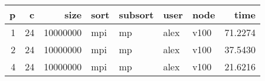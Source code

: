 \begin{tabular}{rrrllllr}
\toprule
 p &  c &     size & sort & subsort & user & node &    time \\
\midrule
 1 & 24 & 10000000 &  mpi &      mp & alex & v100 & 71.2274 \\
 2 & 24 & 10000000 &  mpi &      mp & alex & v100 & 37.5430 \\
 4 & 24 & 10000000 &  mpi &      mp & alex & v100 & 21.6216 \\
\bottomrule
\end{tabular}
